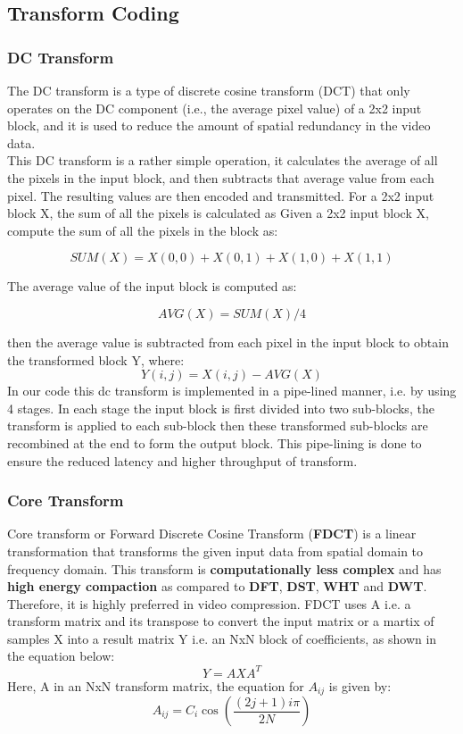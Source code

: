 \subsection{Transform Coding}

\subsubsection{DC Transform}
The DC transform is a type of discrete cosine transform (DCT) that only operates on the DC component (i.e., the average pixel value) of a 2x2 input block, and it is used to reduce the amount of spatial redundancy in the video data.\\
This DC transform is a rather simple operation, it calculates the average of all the pixels in the input block, and then subtracts that average value from each pixel. The resulting values are then encoded and transmitted. For a 2x2 input block X, the sum of all the pixels is calculated as Given a 2x2 input block X, compute the sum of all the pixels in the block as: 

\begin{equation}
	SUM(X) = X(0,0) + X(0,1) + X(1,0) + X(1,1)
\end{equation}

The average value of the input block is computed as:

\begin{equation}
 AVG(X) = SUM(X) / 4
\end{equation}

then the average value is subtracted from each pixel in the input block to obtain the transformed block Y, where:
\begin{equation}
 	Y(i,j) = X(i,j) - AVG(X) 
\end{equation} 	
In our code this dc transform is implemented in a pipe-lined manner, i.e. by using 4 stages. In each stage the input block is first divided into two sub-blocks, the transform is applied to each sub-block then these transformed sub-blocks are recombined at the end to form the output block. This pipe-lining is done to ensure the reduced latency and higher throughput of transform. 

\subsubsection{Core Transform}
Core transform or Forward Discrete Cosine Transform (\textbf{FDCT}) is a linear transformation that transforms the given input data from spatial domain to frequency domain. This transform is \textbf{computationally less complex} and has \textbf{high energy compaction} as compared to \textbf{DFT}, \textbf{DST}, \textbf{WHT} and \textbf{DWT}. Therefore, it is highly preferred in video compression.
FDCT uses A i.e. a transform matrix and its transpose to convert the input matrix or a martix of samples X into a result matrix Y i.e. an NxN block of coefficients, as shown in the equation below:
\begin{equation}
	Y = AXA^{T}
\end{equation}
Here, A in an NxN transform matrix, the equation for $A_{ij}$ is given by:
\[
A_{ij} = C_i \cos\left(\frac{(2j + 1)i\pi}{2N}\right)
\]

